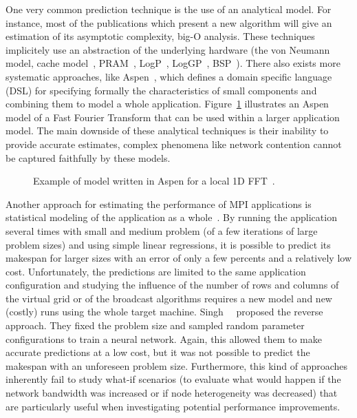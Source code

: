         One very common prediction technique is the use of an analytical model. For instance, most of the publications
        which present a new algorithm will give an estimation of its asymptotic complexity, \aka big-O analysis. These
        techniques implicitely use an abstraction of the underlying hardware (\eg the von Neumann model, cache
        model~\cite{cache_oblivious}, PRAM~\cite{pram}, LogP~\cite{logp}, LogGP~\cite{loggp}, BSP~\cite{bsp}). There
        also exists more systematic approaches, like Aspen~\cite{aspen}, which defines a domain specific language (DSL)
        for specifying formally the characteristics of small components and combining them to model a whole application.
        Figure~\ref{fig:aspen:example} illustrates an Aspen model of a Fast Fourier Transform that can be used within a
        larger application model. The main downside of these analytical techniques is their inability to provide
        accurate estimates, complex phenomena like network contention cannot be captured faithfully by these models.

        \begin{figure}[htpb]
            \centering
            \begin{minipage}[b]{\linewidth}
                \lstset{frame=bt,language=C,numbers=none,escapechar=|}
                
            \end{minipage}
            \caption{Example of model written in Aspen for a local 1D FFT~\cite{aspen}.}
            \label{fig:aspen:example}
        \end{figure}

        Another approach for estimating the performance of MPI applications is statistical modeling of the application
        as a whole~\cite{hpl_prediction}.  By running the application several times with small and medium problem (of a
        few iterations of large problem sizes) and using simple linear regressions, it is possible to predict its
        makespan for larger sizes with an error of only a few percents and a relatively low cost.  Unfortunately, the
        predictions are limited to the same application configuration and studying the influence of the number of rows
        and columns of the virtual grid or of the broadcast algorithms requires a new model and new (costly) runs using
        the whole target machine.  Singh~\etal~\cite{Singh_2007} proposed the reverse approach. They fixed the problem
        size and sampled random parameter configurations to train a neural network. Again, this allowed them to make
        accurate predictions at a low cost, but it was not possible to predict the makespan with an unforeseen problem
        size. Furthermore, this kind of approaches inherently fail to study what-if scenarios (\eg to evaluate what
        would happen if the network bandwidth was increased or if node heterogeneity was decreased) that are
        particularly useful when investigating potential performance improvements.

